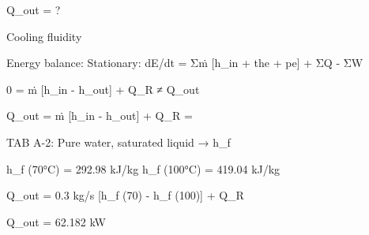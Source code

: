 Q_out = ?  

Cooling fluidity  

Energy balance:  
Stationary:  
dE/dt = Σṁ [h_in + the + pe] + ΣQ - ΣW  

0 = ṁ [h_in - h_out] + Q_R ≠ Q_out  

Q_out = ṁ [h_in - h_out] + Q_R =  

TAB A-2:  
Pure water, saturated liquid → h_f  

h_f (70°C) = 292.98 kJ/kg  
h_f (100°C) = 419.04 kJ/kg  

Q_out = 0.3 kg/s [h_f (70) - h_f (100)] + Q_R  

Q_out = 62.182 kW